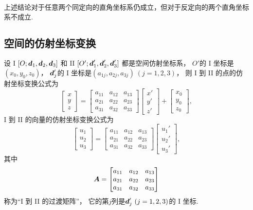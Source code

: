 上述结论对于任意两个同定向的直角坐标系仍成立，但对于反定向的两个直角坐标系不成立.

\subsection{空间的仿射坐标变换}
\begin{theorem}\label{theorem:解析几何.空间的仿射坐标变换公式}
设 I \([O;\boldsymbol{d}_1,\boldsymbol{d}_2,\boldsymbol{d}_3]\)
和 II \([O';\boldsymbol{d}_1',\boldsymbol{d}_2',\boldsymbol{d}_3']\)
都是空间仿射坐标系，
\(O'\)的 I 坐标是\((x_0,y_0,z_0)\)，
\(\boldsymbol{d}_j'\)的 I 坐标是\((a_{1j},a_{2j},a_{3j})\ (j=1,2,3)\)，
则 I 到 II 的点的仿射坐标变换公式为
\begin{equation}
	\begin{bmatrix}
		x \\ y \\ z
	\end{bmatrix} = \begin{bmatrix}
		a_{11} & a_{12} & a_{13} \\
		a_{21} & a_{22} & a_{23} \\
		a_{31} & a_{32} & a_{33}
	\end{bmatrix} \begin{bmatrix}
		x' \\ y' \\ z'
	\end{bmatrix} + \begin{bmatrix}
		x_0 \\ y_0 \\ z_0
	\end{bmatrix},
\end{equation}
I 到 II 的向量的仿射坐标变换公式为
\begin{equation}
	\begin{bmatrix}
		u_1 \\ u_2 \\ u_3
	\end{bmatrix} = \begin{bmatrix}
		a_{11} & a_{12} & a_{13} \\
		a_{21} & a_{22} & a_{23} \\
		a_{31} & a_{32} & a_{33}
	\end{bmatrix} \begin{bmatrix}
		u_1' \\ u_2' \\ u_3'
	\end{bmatrix},
\end{equation}
其中\[
	\boldsymbol{A} = \begin{bmatrix}
		a_{11} & a_{12} & a_{13} \\
		a_{21} & a_{22} & a_{23} \\
		a_{31} & a_{32} & a_{33}
	\end{bmatrix}
\]称为“I 到 II 的过渡矩阵”，
它的第\(j\)列是\(\boldsymbol{d}_j'\ (j=1,2,3)\)的 I 坐标.
\end{theorem}

